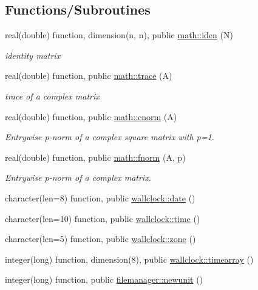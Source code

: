 \subsection*{Functions/\+Subroutines}
\begin{DoxyCompactItemize}
\item 
real(double) function, dimension(n, n), public \hyperlink{namespacemath_a43efec08acf55747fa1e14085858aade}{math\+::iden} (N)
\begin{DoxyCompactList}\small\item\em identity matrix \end{DoxyCompactList}\item 
real(double) function, public \hyperlink{namespacemath_a9f8f22c01066f03fe5900edb63b56c89}{math\+::trace} (A)
\begin{DoxyCompactList}\small\item\em trace of a complex matrix \end{DoxyCompactList}\item 
real(double) function, public \hyperlink{namespacemath_a864984937cf0f3b7bdbc9b652b84445d}{math\+::cnorm} (A)
\begin{DoxyCompactList}\small\item\em Entrywise p-\/norm of a complex square matrix with p=1. \end{DoxyCompactList}\item 
real(double) function, public \hyperlink{namespacemath_a2830cb5393b6e6a8baa8d072c73ce8a9}{math\+::fnorm} (A, p)
\begin{DoxyCompactList}\small\item\em Entrywise p-\/norm of a complex matrix. \end{DoxyCompactList}\item 
character(len=8) function, public \hyperlink{namespacewallclock_aac2bc47e557d4981f481295bd687dd50}{wallclock\+::date} ()
\item 
character(len=10) function, public \hyperlink{namespacewallclock_a3efb3d12447df7568e0b22b3cd4ed60d}{wallclock\+::time} ()
\item 
character(len=5) function, public \hyperlink{namespacewallclock_ac6bdcdd3cf7fc38f4c738862e2a82dac}{wallclock\+::zone} ()
\item 
integer(long) function, dimension(8), public \hyperlink{namespacewallclock_ac691a026a7b92c6cd971e86d0449d42b}{wallclock\+::timearray} ()
\item 
integer(long) function, public \hyperlink{namespacefilemanager_aa389048ef7c9eb9afdac7ce1dcc691b2}{filemanager\+::newunit} ()

\end{DoxyCompactItemize}
